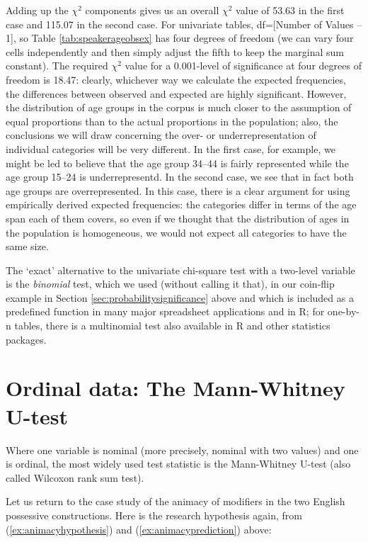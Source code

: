 Adding up the $\chi^2$ components gives us an overall $\chi^2$ value of 53.63 in the first case and 115.07 in the second case. For univariate tables, df=[Number of Values -- 1], so Table \ref{tab:speakerageobsex} has four degrees of freedom (we can vary four cells independently and then simply adjust the fifth to keep the marginal sum constant). The required $\chi^2$ value for a 0.001-level of significance at four degrees of freedom is 18.47: clearly, whichever way we calculate the expected frequencies, the differences between observed and expected are highly significant. However, the distribution of age groups in the corpus is much closer to the assumption of equal proportions than to the actual proportions in the population; also, the conclusions we will draw concerning the over- or underrepresentation of individual categories will be very different. In the first case, for example, we might be led to believe that the age group 34--44 is fairly represented while the age group 15--24 is underrepresentd. In the second case, we see that in fact both age groups are overrepresented. In this case, there is a clear argument for using empirically derived expected frequencies: the categories differ in terms of the age span each of them covers, so even if we thought that the distribution of ages in the population is homogeneous, we would not expect all categories to have the same size.

The `exact' alternative to the univariate chi-square test with a two-level variable is the \textit{binomial} test, which we used (without calling it that), in our coin-flip example in Section \ref{sec:probabilitysignificance} above and which is included as a predefined function in many major spreadsheet applications and in R; for one-by-n tables, there is a multinomial test also available in R and other statistics packages.

\section{Ordinal data: The Mann-Whitney U-test}
\label{sec:mannwhitneytest}

Where one variable is nominal (more precisely, nominal with two values) and one is ordinal, the most widely used test statistic is the Mann-Whitney U-test (also called Wilcoxon rank sum test).

Let us return to the case study of the animacy of modifiers in the two English possessive constructions. Here is the research hypothesis again, from (\ref{ex:animacyhypothesis}) and (\ref{ex:animacyprediction}) above:

